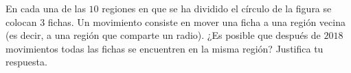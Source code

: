 En cada una de las $10$ regiones en que se ha dividido el círculo de la figura se colocan $3$ fichas. Un movimiento consiste en mover una ficha a una región vecina (es decir, a una región que comparte un radio). ¿Es posible que después de $2018$ movimientos todas las fichas se encuentren en la misma región? Justifica tu respuesta.